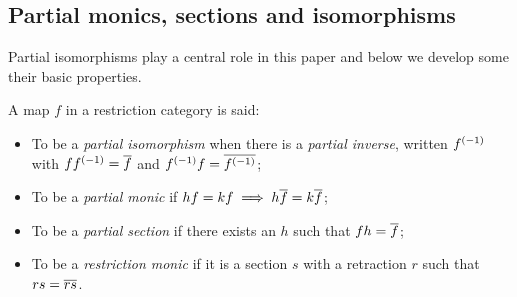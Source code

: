 \subsection{Partial monics, sections and isomorphisms} %
\label{sub:restricted_monics_sections_and_partial_isomorphisms}

Partial isomorphisms play a central role in this paper and below we develop
some their basic properties.

\begin{definition} 
  A map $f$ in a restriction category \X is said:
  \begin{itemize}
    \item To be a \emph{partial isomorphism} when there is a \emph{partial inverse}, written 
      ${f}^{(-1)}$ with $f{f}^{(-1)} =\overline{f}$ and ${f}^{(-1)}f = \overline{{f}^{(-1)}}$;
    \item To be a \emph{partial monic} if $h f = k f \implies h \overline{f} = k \overline{f}$;
    \item To be a \emph{partial section} if there exists an  $h$ such that $f h = \overline{f}$;
    \item To be a \emph{restriction monic} if it is a section $s$ with a retraction
      $r$ such that $r s = \overline{r s}$.
  \end{itemize}
\end{definition}


